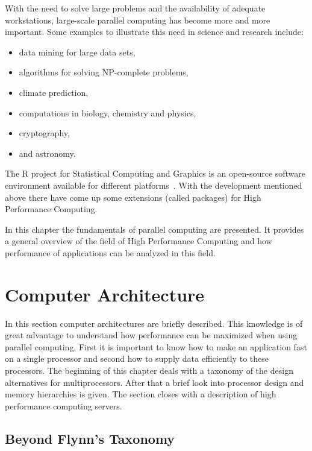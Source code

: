 With the need to solve large problems and the availability of adequate
workstations, large-scale parallel computing has become more and more
important. Some examples to illustrate this need in science and
research include:
\begin{itemize}
\item data mining for large data sets,
\item algorithms for solving NP-complete problems,
\item climate prediction,
\item computations in biology, chemistry and physics,
\item cryptography,
\item and astronomy.
\end{itemize}

The R project for Statistical Computing and Graphics is an open-source
software environment available for different
platforms~\cite{Rcore07R}. With the 
development mentioned above there have come up some extensions (called
packages) for High Performance Computing.

In this chapter the fundamentals of parallel computing are
presented. It provides a general overview of the field of High
Performance Computing and how performance of applications can be
analyzed in this field.

\section{Computer Architecture}
In this section computer architectures are briefly described. This
knowledge is of great advantage to
understand how performance can be maximized when using parallel
computing. First it is important to know how to make an application fast
on a single processor and second how to supply data efficiently to
these processors. The beginning of this chapter deals with a taxonomy of
the design alternatives for multiprocessors. After that a brief look
into processor design and memory hierarchies is given. The section
closes with a description of high performance computing servers.

\subsection{Beyond Flynn's Taxonomy}

